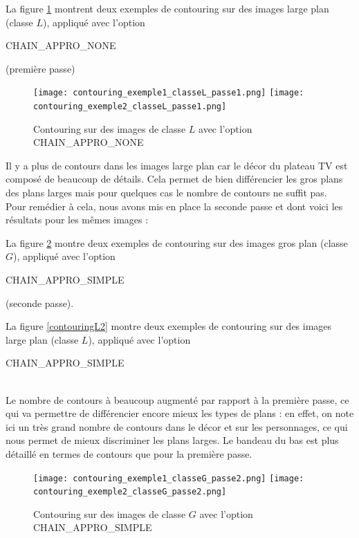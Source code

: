 \documentclass{book}
\begin{document}
La figure \ref{contouringL1} montrent deux exemples de contouring sur des images \og large plan \fg{} (classe $L$), appliqué
avec l'option \begin{itshape}CHAIN\_APPRO\_NONE\end{itshape} (première passe)

\begin{figure}[H]
\begin{center}
\texttt{[image: contouring\_exemple1\_classeL\_passe1.png]}
\texttt{[image: contouring\_exemple2\_classeL\_passe1.png]}
\end{center}
\caption{Contouring sur des images de classe $L$ avec l'option CHAIN\_APPRO\_NONE}
\label{contouringL1}
\end{figure}

Il y a plus de contours dans les images \og large plan \fg{} car le décor du plateau TV est composé de beaucoup de détails.
Cela permet de bien différencier les gros plans des plans larges mais pour quelques cas le nombre de 
contours ne suffit pas.\\
Pour remédier à cela, nous avons mis en place la seconde passe et dont voici les résultats pour les mêmes 
images : 

La figure \ref{contouringG2} montre deux exemples de contouring sur des images \og gros plan \fg{} (classe $G$), appliqué
avec l'option \begin{itshape}CHAIN\_APPRO\_SIMPLE\end{itshape} (seconde passe).

La figure \ref{contouringL2} montre deux 
exemples de contouring sur des images \og large plan \fg{} (classe $L$), appliqué avec 
l'option \begin{itshape}CHAIN\_APPRO\_SIMPLE\end{itshape}\\


Le nombre de contours à beaucoup augmenté par rapport à la première passe, ce qui va permettre de différencier encore mieux 
les types de plans : en effet, on note ici un très grand nombre de contours dans le décor et sur les personnages, ce qui nous permet de 
mieux discriminer les plans larges.
Le bandeau du bas est plus détaillé en termes de contours que pour la première passe.

\begin{figure}[H]
\begin{center}
\texttt{[image: contouring\_exemple1\_classeG\_passe2.png]}
\texttt{[image: contouring\_exemple2\_classeG\_passe2.png]}
\end{center}
\caption{Contouring sur des images de classe $G$ avec l'option CHAIN\_APPRO\_SIMPLE}
\label{contouringG2}
\end{figure}
\end{document}
